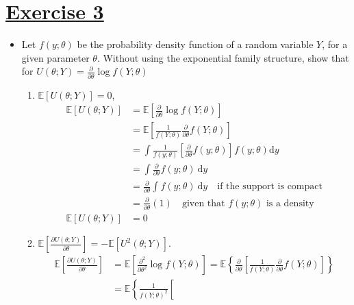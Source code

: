 \documentclass[a4paper,12pt]{article}
\def\oc{\left[}
\def\cc{\right]}
\def\ok{\left\{}
\def\ck{\right\}}
\def\exE{\mathbb{E}}
\begin{document}
\section{\underline{Exercise 3}}
\begin{itemize}
\item Let $f(y;\theta)$ be the probability density function of a random variable $Y$, for a given parameter $\theta$. Without using the exponential family structure, show that for ${\displaystyle U(\theta;Y) = \frac{\partial}{\partial \theta} \log f(Y;\theta)}$

{\color{blue}
  
}

\begin{enumerate}
    \item{$\exE\left[U(\theta;Y)\right]=0$,}
      {\color{blue}
        \begin{align*}
          \exE\oc U(\theta;Y)\cc  
          &= 
          \exE\oc \frac{\partial}{\partial \theta} \log f(Y;\theta)\cc\\  
          &= 
          \exE\oc \frac{1}{f(Y;\theta)} \frac{\partial}{\partial \theta} f(Y;\theta)\cc \\ 
          &= 
          \int \frac{1}{f(y;\theta)} \oc \frac{\partial}{\partial \theta} f(y;\theta) \cc f(y;\theta) \mathrm{d}y \\
          &= 
          \int  \frac{\partial}{\partial \theta} f(y;\theta) \ \mathrm{d}y \\
          &= 
          \frac{\partial}{\partial \theta} \int f(y;\theta)  \  \mathrm{d}y \quad \textrm{if the support is compact} \\
          &=
          \frac{\partial}{\partial \theta} (1) \quad \textrm{given that $f(y;\theta)$ is a density}\\
          \exE\oc U(\theta;Y)\cc  &= 0
        \end{align*}
      }
    \item{${\displaystyle \exE\left[\frac{\partial U(\theta;Y)}{ \partial \theta}\right]= - \exE\oc U^2(\theta;Y)\cc}$.}
      {\color{blue} 
        \begin{align*}
          \exE\oc\frac{\partial U(\theta;Y)}{ \partial \theta}\cc 
          &=  
          \exE\oc\frac{\partial^2}{\partial \theta^2} \log f(Y;\theta)\cc  
          = 
          \exE\ok \frac{\partial}{\partial \theta}\oc \frac{1}{f(Y;\theta)} \frac{\partial}{\partial \theta} f(Y;\theta)\cc \ck \\
          &= 
          \exE\ok  \frac{1}{f(Y;\theta)^2} \oc  

\end{align*}}
\end{enumerate}
\end{itemize}
\end{document}
